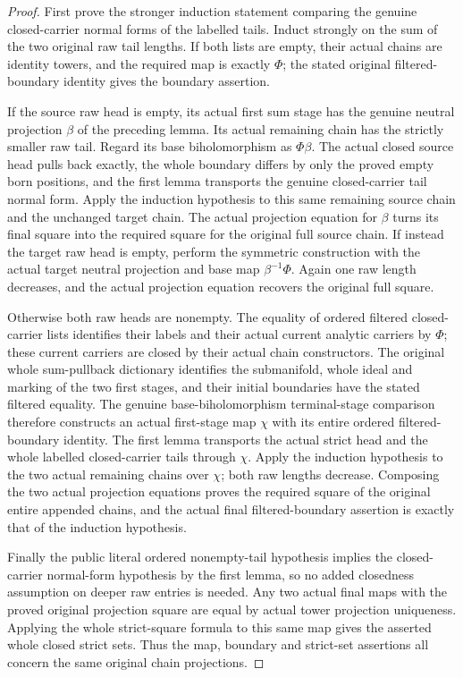 \begin{proof}
First prove the stronger induction statement comparing the genuine
closed-carrier normal forms of the labelled tails. Induct strongly on
the sum of the two original raw tail lengths. If both lists are empty,
their actual chains are identity towers, and the required map is
exactly $\Phi$; the stated original filtered-boundary identity gives
the boundary assertion.

If the source raw head is empty, its actual first sum stage has the
genuine neutral projection $\beta$ of the preceding lemma. Its actual
remaining chain has the strictly smaller raw tail. Regard its base
biholomorphism as $\Phi\beta$. The actual closed source head pulls back
exactly, the whole boundary differs by only the proved empty born
positions, and the first lemma transports the genuine closed-carrier
tail normal form. Apply the induction hypothesis to this same remaining
source chain and the unchanged target chain. The actual projection
equation for $\beta$ turns its final square into the required square for
the original full source chain. If instead the target raw head is empty,
perform the symmetric construction with the actual target neutral
projection and base map $\beta^{-1}\Phi$. Again one raw length decreases,
and the actual projection equation recovers the original full square.

Otherwise both raw heads are nonempty. The equality of ordered filtered
closed-carrier lists identifies their labels and their actual current
analytic carriers by $\Phi$; these current carriers are closed by their
actual chain constructors. The original whole sum-pullback dictionary
identifies the submanifold, whole ideal and marking of the two first
stages, and their initial boundaries have the stated filtered equality.
The genuine base-biholomorphism terminal-stage comparison therefore
constructs an actual first-stage map $\chi$ with its entire ordered
filtered-boundary identity. The first lemma transports the actual strict
head and the whole labelled closed-carrier tails through $\chi$. Apply
the induction hypothesis to the two actual remaining chains over
$\chi$; both raw lengths decrease. Composing the two actual projection
equations proves the required square of the original entire appended
chains, and the actual final filtered-boundary assertion is exactly
that of the induction hypothesis.

Finally the public literal ordered nonempty-tail hypothesis implies the
closed-carrier normal-form hypothesis by the first lemma, so no added
closedness assumption on deeper raw entries is needed. Any two actual
final maps with the proved original projection square are equal by
actual tower projection uniqueness. Applying the whole strict-square
formula to this same map gives the asserted whole closed strict sets.
Thus the map, boundary and strict-set assertions all concern the same
original chain projections.
\end{proof}

